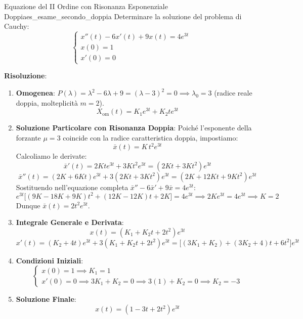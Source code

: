 \begin{esempio}{Equazione del II Ordine con Risonanza Esponenziale Doppia}{es_esame_secondo_doppia}
Determinare la soluzione del problema di Cauchy:
\[
    \begin{cases}
        x''(t) - 6 x'(t) + 9 x(t) = 4 e^{3t} \\
        x(0) = 1 \\
        x'(0) = 0
    \end{cases}
\]

\textbf{Risoluzione}:
\begin{enumerate}
    \item \textbf{Omogenea}: $P(\lambda) = \lambda^2 - 6\lambda + 9 = (\lambda - 3)^2 = 0 \implies \lambda_0 = 3$ (radice reale doppia, molteplicità $m = 2$).
    \[
        X_{\text{om}}(t) = K_1 e^{3t} + K_2 t e^{3t}
    \]
    \item \textbf{Soluzione Particolare con Risonanza Doppia}:
    Poiché l'esponente della forzante $\mu = 3$ coincide con la radice caratteristica doppia, impostiamo:
    \[
        \bar{x}(t) = K\, t^2 e^{3t}
    \]
    Calcoliamo le derivate:
    \[
        \bar{x}'(t) = 2K t e^{3t} + 3K t^2 e^{3t} = (2Kt + 3Kt^2) e^{3t}
    \]
    \[
        \bar{x}''(t) = (2K + 6Kt) e^{3t} + 3(2Kt + 3Kt^2) e^{3t} = (2K + 12Kt + 9Kt^2) e^{3t}
    \]
    Sostituendo nell'equazione completa $\bar{x}'' - 6\bar{x}' + 9\bar{x} = 4e^{3t}$:
    \[
        e^{3t} \Big[ (9K - 18K + 9K)t^2 + (12K - 12K)t + 2K \Big] = 4e^{3t} \implies 2K e^{3t} = 4e^{3t} \implies K = 2
    \]
    Dunque $\bar{x}(t) = 2t^2 e^{3t}$.
    \item \textbf{Integrale Generale e Derivata}:
    \[
        x(t) = (K_1 + K_2 t + 2t^2) e^{3t}
    \]
    \[
        x'(t) = (K_2 + 4t) e^{3t} + 3(K_1 + K_2 t + 2t^2) e^{3t} = \big[ (3K_1 + K_2) + (3K_2 + 4)t + 6t^2 \big] e^{3t}
    \]
    \item \textbf{Condizioni Iniziali}:
    \[
        \begin{cases}
            x(0) = 1 \implies K_1 = 1 \\
            x'(0) = 0 \implies 3K_1 + K_2 = 0 \implies 3(1) + K_2 = 0 \implies K_2 = -3
        \end{cases}
    \]
    \item \textbf{Soluzione Finale}:
    \[
        x(t) = (1 - 3t + 2t^2) e^{3t}
    \]
\end{enumerate}
\end{esempio}

